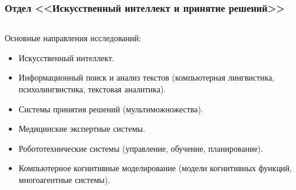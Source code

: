 \documentclass[default]{beamer}
\begin{document}
	\begin{frame}
		\frametitle{Отдел <<Искусственный интеллект и принятие решений>>}
		
		\begin{columns}
		\begin{column}{0.7\textwidth}
			\small
			Основные направления исследований:
			\begin{itemize}
				\item Искусственный интеллект.
				\item Информационный поиск и анализ текстов (компьютерная лингвистика, психолингвистика, текстовая аналитика).
				\item Системы принятия решений (мультиможножества).
				\item Медицинские экспертные системы.
				\item Робототехнические системы (управление, обучение, планирование).
				\item Компьютерное когнитивные моделирование (модели когнитивных функций, многоагентные системы).
			\end{itemize}
			

\end{column}
\end{columns}
\end{frame}
\end{document}
